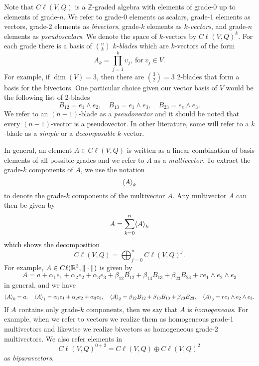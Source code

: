 Note that $C\ell(V,Q)$ is a $\mathbb{Z}$-graded algebra with elements of grade-0 up to elements of grade-$n$. We refer to grade-0 elements as scalars, grade-1 elements as vectors, grade-2 elements as \emph{bivectors}, grade-$k$ elements as \emph{$k$-vectors}, and grade-$n$ elements as \emph{pseudoscalars}. We denote the space of $k$-vectors by $C\ell(V,Q)^k$. For each grade there is a basis of ${n\choose k}$ \emph{$k$-blades} which are $k$-vectors of the form
\[
A_k = \prod_{j=1}^k v_j, ~\textrm{for}~ v_j \in V.
\]
For example, if $\dim(V)=3$, then there are ${3\choose 2}=3$ 2-blades that form a basis for the bivectors. One particular choice given our vector basis of $V$ would be the following list of 2-blades
\[
\label{eq:3_dim_basis}
B_{12} = e_1 \wedge e_2, \quad B_{13} = e_1 \wedge e_3, \quad B_{23} = e_e \wedge e_3.
\]
We refer to an $(n-1)$-blade as a \emph{pseudovector} and it should be noted that every $(n-1)$-vector is a pseudovector. In other literature, some will refer to a $k$-blade as a \emph{simple} or a \emph{decomposable} $k$-vector. 

In general, an element $A \in C\ell(V,Q)$ is written as a linear combination of basis elements of all possible grades and we refer to $A$ as a \emph{multivector}.  To extract the grade-$k$ components of $A$, we use the notation
\[
\proj{k}{A}
\]
to denote the grade-$k$ components of the multivector $A$. Any multivector $A$ can then be given by
\[
A = \sum_{k=0}^n \proj{k}{A}
\]
which shows the decomposition
\[
C\ell(V,Q) = \bigoplus_{j=0}^n C\ell(V,Q)^j.
\]
For example, $A\in C\ell(\R^3, \|\cdot \|)$ is given by
\[
A= a + \alpha_1 e_1 + \alpha_2 e_2 + \alpha_3 e_3 + \beta_{12} B_{12} + \beta_{13} B_{13} + \beta_{23} B_{23} + r e_1 \wedge e_2 \wedge e_3
\]
in general, and we have
\[
\proj{0}{A}=a, \quad \proj{1}{A}=\alpha_1 e_1 + \alpha_2 e_2 + \alpha_3 e_3, \quad \proj{2}{A}=\beta_{12} B_{12} + \beta_{13} B_{13} + \beta_{23} B_{23}, \quad \proj{3}{A} = re_1 \wedge e_2 \wedge e_3.
\]
If $A$ contains only grade-$k$ components, then we say that $A$ is \emph{homogeneous}.  For example, when we refer to vectors we realize them as homogeneous grade-1 multivectors and likewise we realize bivectors as homogeneous grade-2 multivectors. We also refer elements in
\[
 C\ell(V,Q)^{0+2} = C\ell(V,Q)\oplus C\ell(V,Q)^2
\]
as \emph{biparavectors}.

